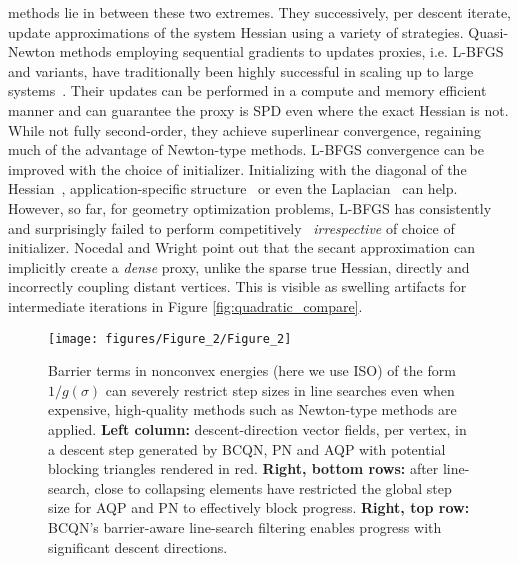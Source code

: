  methods lie in between these two extremes. They
successively, per descent iterate, update approximations of the
system Hessian using a variety of strategies.  Quasi-Newton methods
employing sequential gradients to updates proxies, i.e.  L-BFGS and
variants, have traditionally been highly successful in scaling up
to large systems~\cite{Bertsekas:2016:NOP}. Their updates can be
performed in a compute and memory efficient manner and
can guarantee the proxy is SPD even where the exact Hessian is not.
While not fully second-order, they achieve superlinear convergence, regaining
much of the advantage of Newton-type methods. L-BFGS convergence
can be improved with the choice of initializer. Initializing with the
diagonal of the Hessian\ \cite{Nocedal:2006:Book}, application-specific
structure\ \cite{Jiang:2004:APL} or even the Laplacian\ \cite{Liu:2016:TRT}
can help. However, so far, for geometry optimization problems,
L-BFGS has consistently and surprisingly failed to perform
competitively~\cite{Kovalsky:2016:AQP,Rabinovich:2016:SLI}
\emph{irrespective} of choice of initializer. Nocedal and Wright point
out that the secant approximation can implicitly create a \emph{dense}
proxy, unlike the sparse true Hessian, directly and incorrectly
coupling distant vertices. This is visible as swelling artifacts
for intermediate iterations in Figure \ref{fig:quadratic_compare}.

\begin{figure}[h!]
\centering
\texttt{[image: figures/Figure\_2/Figure\_2]}
\caption{ Barrier terms in nonconvex energies (here we use ISO) of the form $1/g(\sigma)$ can severely restrict step sizes in line searches even when expensive, high-quality methods such as Newton-type methods are applied. {\bf Left column:} descent-direction vector fields, per vertex, in a descent step generated by BCQN, PN and AQP with potential blocking triangles rendered in red. {\bf Right, bottom rows:} after line-search, close to collapsing elements have restricted the global step size for AQP and PN to effectively block progress. {\bf Right, top row:} BCQN's barrier-aware line-search filtering enables progress with significant descent directions.}
\label{fig:blocked_line_search}
\end{figure}

